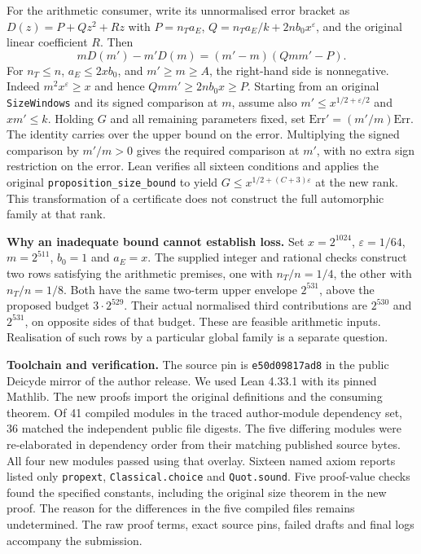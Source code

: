 \documentclass[11pt,a4paper]{article}
\newcommand{\lead}[1]{\textbf{#1}\enspace}
\begin{document}
For the arithmetic consumer, write its unnormalised error bracket as \(D(z)=P+Qz^2+Rz\) with \(P=n_Ta_E\), \(Q=n_Ta_E/k+2n b_0x^\varepsilon\), and the original linear coefficient \(R\). Then
\[
mD(m')-m'D(m)=(m'-m)(Qmm'-P).
\]
For \(n_T\leq n\), \(a_E\leq 2xb_0\), and \(m'\geq m\geq A\), the right-hand side is nonnegative. Indeed \(m^2x^\varepsilon\geq x\) and hence \(Qmm'\geq2nb_0x\geq P\). Starting from an original \texttt{SizeWindows} and its signed comparison at \(m\), assume also \(m'\leq x^{1/2+\varepsilon/2}\) and \(xm'\leq k\). Holding \(G\) and all remaining parameters fixed, set \(\mathrm{Err}'=(m'/m)\mathrm{Err}\). The identity carries over the upper bound on the error. Multiplying the signed comparison by \(m'/m>0\) gives the required comparison at \(m'\), with no extra sign restriction on the error. Lean verifies all sixteen conditions and applies the original \texttt{proposition\_size\_bound} to yield \(G\leq x^{1/2+(C+3)\varepsilon}\) at the new rank. This transformation of a certificate does not construct the full automorphic family at that rank.

\lead{Why an inadequate bound cannot establish loss.} Set \(x=2^{1024}\), \(\varepsilon=1/64\), \(m=2^{511}\), \(b_0=1\) and \(a_E=x\). The supplied integer and rational checks construct two rows satisfying the arithmetic premises, one with \(n_T/n=1/4\), the other with \(n_T/n=1/8\). Both have the same two-term upper envelope \(2^{531}\), above the proposed budget \(3\cdot2^{529}\). Their actual normalised third contributions are \(2^{530}\) and \(2^{531}\), on opposite sides of that budget. These are feasible arithmetic inputs. Realisation of such rows by a particular global family is a separate question.

\lead{Toolchain and verification.} The source pin is \texttt{e50d09817ad8} in the public Deicyde mirror of the author release. We used Lean 4.33.1 with its pinned Mathlib. The new proofs import the original definitions and the consuming theorem. Of 41 compiled modules in the traced author-module dependency set, 36 matched the independent public file digests. The five differing modules were re-elaborated in dependency order from their matching published source bytes. All four new modules passed using that overlay. Sixteen named axiom reports listed only \texttt{propext}, \texttt{Classical.choice} and \texttt{Quot.sound}. Five proof-value checks found the specified constants, including the original size theorem in the new proof. The reason for the differences in the five compiled files remains undetermined. The raw proof terms, exact source pins, failed drafts and final logs accompany the submission.
\end{document}
